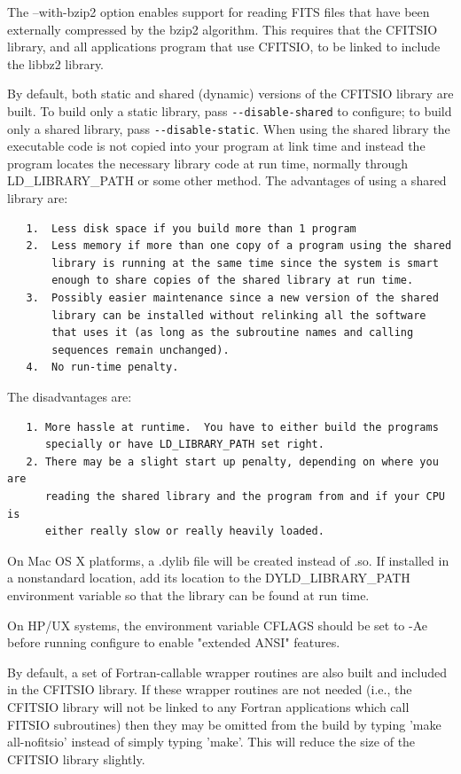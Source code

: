 \documentclass[11pt]{book}
\begin{document}
The --with-bzip2 option enables support for reading FITS files that have been
externally compressed by the bzip2 algorithm.  This requires that the CFITSIO
library, and all applications program that use CFITSIO, to be linked to include
the libbz2 library.

By default, both static and shared (dynamic) versions of the
CFITSIO library are built.  To build only a static library, pass
\verb+--disable-shared+ to configure; to build only a shared library,
pass \verb+--disable-static+.  When using the shared library the
executable code is not copied into your program at link time and
instead the program locates the necessary library code at run time,
normally through LD\_LIBRARY\_PATH or some other method.  The
advantages of using a shared library are:

\begin{verbatim}
   1.  Less disk space if you build more than 1 program
   2.  Less memory if more than one copy of a program using the shared
       library is running at the same time since the system is smart
       enough to share copies of the shared library at run time.
   3.  Possibly easier maintenance since a new version of the shared
       library can be installed without relinking all the software
       that uses it (as long as the subroutine names and calling
       sequences remain unchanged).
   4.  No run-time penalty.
\end{verbatim}
The disadvantages are:

\begin{verbatim}
   1. More hassle at runtime.  You have to either build the programs
      specially or have LD_LIBRARY_PATH set right.
   2. There may be a slight start up penalty, depending on where you are
      reading the shared library and the program from and if your CPU is
      either really slow or really heavily loaded.
\end{verbatim}

On Mac OS X platforms, a .dylib file will be created instead of .so.
If installed in a nonstandard location, add its location to the
DYLD\_LIBRARY\_PATH environment variable so that the library can be
found at run time.

On HP/UX systems, the environment variable CFLAGS should be set
to -Ae before running configure to enable "extended ANSI" features.

By default, a set of Fortran-callable wrapper routines are
also built and included in the CFITSIO library.  If these wrapper
routines are not needed (i.e., the CFITSIO library will not
be linked to any Fortran applications which call FITSIO subroutines)
then they may be omitted from the build by typing 'make all-nofitsio'
instead of simply typing 'make'.  This will reduce the size
of the CFITSIO library slightly.
\end{document}
